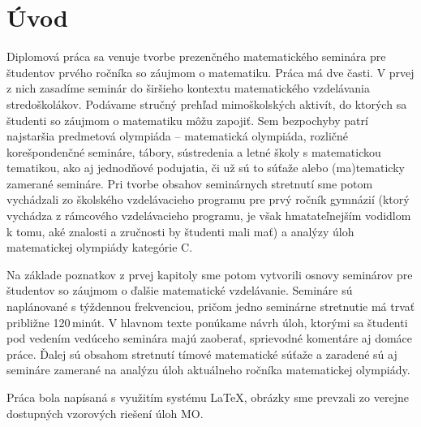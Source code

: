 \newcommand{\seminar}[1]{
  \setcounter{seminar}{#1}
  \setcounter{problem}{0}
  \subsection*{Seminár #1}
}



\HlavickaUvod
\setcounter{page}{1}

\chapter*{Úvod}
\label{chap:intro}


Diplomová práca sa venuje tvorbe prezenčného matematického seminára pre študentov prvého ročníka so záujmom o matematiku. Práca má dve časti. V prvej z nich zasadíme seminár do širšieho kontextu matematického vzdelávania stredoškolákov. Podávame stručný prehľad mimoškolských aktivít, do ktorých sa študenti so záujmom o matematiku môžu zapojiť. Sem bezpochyby patrí najstaršia predmetová olympiáda -- matematická olympiáda, rozličné korešpondenčné semináre, tábory, sústredenia a letné školy s matematickou tematikou, ako aj jednodňové podujatia, či už sú to súťaže alebo (ma)tematicky zamerané semináre. Pri tvorbe obsahov seminárnych stretnutí sme potom vychádzali zo školského vzdelávacieho programu pre prvý ročník gymnázií (ktorý vychádza z rámcového vzdelávacieho programu, je však hmatateľnejším vodidlom k tomu, aké znalosti a zručnosti by študenti mali mať) a analýzy úloh matematickej olympiády kategórie C.

Na základe poznatkov z prvej kapitoly sme potom vytvorili osnovy seminárov pre študentov so záujmom o ďalšie matematické vzdelávanie. Semináre sú naplánované s týždennou frekvenciou, pričom jedno seminárne stretnutie má trvať približne 120\,minút. V hlavnom texte ponúkame návrh úloh, ktorými sa študenti pod vedením vedúceho seminára majú zaoberať, sprievodné komentáre aj domáce práce. Ďalej sú obsahom stretnutí tímové matematické súťaže a zaradené sú aj semináre zamerané na analýzu úloh aktuálneho ročníka matematickej olympiády.

Práca bola napísaná s využitím systému \LaTeX, obrázky sme prevzali zo verejne dostupných vzorových riešení úloh MO.


